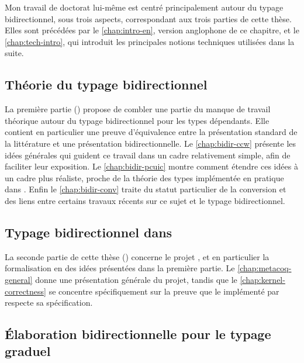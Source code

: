 Mon travail de doctorat lui-même
est centré principalement autour du typage bidirectionnel, sous
trois aspects, correspondant aux trois parties de cette thèse.
Elles sont précédées par le \cref{chap:intro-en}, version anglophone
de ce chapitre, et le \cref{chap:tech-intro}, qui introduit les principales
notions techniques utilisées dans la suite.

\subsection{Théorie du typage bidirectionnel}

La première partie () propose de combler une partie du
manque de travail théorique autour du typage bidirectionnel pour les types dépendants.
Elle contient en particulier une
preuve d’équivalence entre la présentation standard de la littérature
et une présentation bidirectionnelle.
Le \cref{chap:bidir-ccw} présente les idées générales qui guident ce travail
dans un cadre relativement simple, afin de faciliter leur exposition. 
Le \cref{chap:bidir-pcuic} montre comment étendre ces idées à un
cadre plus réaliste, proche de la théorie des types implémentée en pratique dans .
Enfin le \cref{chap:bidir-conv} traite du statut particulier de la
conversion
et des liens entre certains travaux récents sur ce sujet et le typage bidirectionnel.

\subsection{Typage bidirectionnel dans }

La seconde partie de cette thèse ()
concerne le projet ,
et en particulier la formalisation en  des idées présentées dans la
première partie. Le \cref{chap:metacoq-general} donne une présentation générale du
projet, tandis que le \cref{chap:kernel-correctness} se concentre spécifiquement
sur la preuve que le  implémenté par  respecte sa spécification.

\subsection{Élaboration bidirectionnelle pour le typage graduel}

